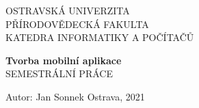 
\begin{titlepage}
\begin{center}

\Large{OSTRAVSKÁ UNIVERZITA} \\
\Large{PŘÍRODOVĚDECKÁ FAKULTA}\\
\Large{KATEDRA INFORMATIKY A POČÍTAČŮ}
\vspace{8cm}

\huge{\textbf{Tvorba mobilní aplikace}}\\
\vspace{1cm}
\Large{SEMESTRÁLNÍ PRÁCE}

\vspace{7cm}

\end{center}

\normalsize{Autor: Jan Sonnek \hfill Ostrava, 2021}

\end{titlepage}

